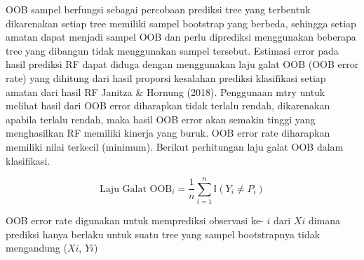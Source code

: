 OOB sampel berfungsi sebagai percobaan prediksi tree yang terbentuk dikarenakan setiap tree memiliki sampel bootstrap yang berbeda, sehingga setiap amatan dapat menjadi sampel OOB dan perlu diprediksi menggunakan beberapa tree yang dibangun tidak menggunakan sampel tersebut. Estimasi error pada hasil prediksi RF dapat diduga dengan menggunakan laju galat OOB (OOB error rate) yang dihitung dari hasil proporsi kesalahan prediksi klasifikasi setiap amatan dari hasil RF Janitza \& Hornung (2018). Penggunaan mtry untuk melihat hasil dari OOB error diharapkan tidak terlalu rendah, dikarenakan apabila terlalu rendah, maka hasil OOB error akan semakin tinggi yang menghasilkan RF memiliki kinerja yang buruk. OOB error rate diharapkan memiliki nilai terkecil (minimum). Berikut perhitungan laju galat OOB dalam klasifikasi.

\begin{equation}
    \text{Laju Galat } \text{OOB}_i = \frac{1}{n} \sum_{i=1}^{n} \mathbb{I}(Y_i \neq P_i)
    \end{equation}

OOB error rate digunakan untuk memprediksi observasi ke- $i$ dari $Xi$ dimana
prediksi hanya berlaku untuk suatu tree yang sampel bootstrapnya tidak mengandung ($Xi$, $Yi$)
    